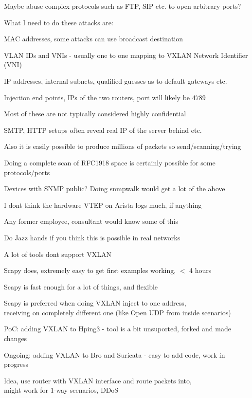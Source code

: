 \documentclass[16pt,landscape,a4paper,footrule]{foils}
\begin{document}
Maybe abuse complex protocols such as FTP, SIP etc. to open arbitrary ports?


What I need to do these attacks are:
\begin{list2}
\item MAC addresses, some attacks can use broadcast destination
\item VLAN IDs and VNIs - usually one to one mapping to VXLAN Network Identifier (VNI)
\item IP addresses, internal subnets, qualified guesses as to default gateways etc.
\item Injection end points, IPs of the two routers, port will likely be 4789
\item Most of these are not typically considered highly confidential
\item SMTP, HTTP setups often reveal real IP of the server behind etc.
\item Also it is easily possible to produce millions of packets so send/scanning/trying
\item Doing a complete scan of RFC1918 space is certainly possible for some protocols/ports
\item Devices with SNMP public? Doing snmpwalk would get a lot of the above
\item I dont think the hardware VTEP on Arista logs much, if anything
\end{list2}

\vskip 1cm
Any former employee, consultant would know some of this

Do Jazz hands if you think this is possible in real networks


\begin{list2}
\item A lot of tools dont support VXLAN
\item Scapy does, extremely easy to get first examples working, $<$ 4 hours
\item Scapy is fast enough for a lot of things, and flexible
\item Scapy is preferred when doing VXLAN inject to one address, \\
receiving on completely different one (like Open UDP from inside scenarios)
\item PoC: adding VXLAN to Hping3 - tool is a bit unsuported, forked and made changes
\item Ongoing: adding VXLAN to Bro and Suricata - easy to add code, work in progress
\item Idea, use router with VXLAN interface and route packets into,\\ might work for 1-way scenarios, DDoS
\end{list2}
\end{document}
